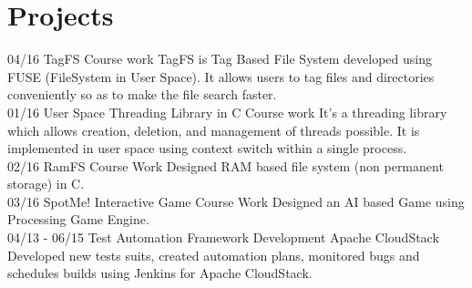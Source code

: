 \documentclass[]{friggeri-cv}
\begin{document}
\section{Projects}
\begin{entrylist}
  \entry
    {04/16}
    {TagFS}
    {Course work}
    {TagFS is Tag Based File System developed using FUSE (FileSystem in User Space). It allows users to tag files and directories conveniently so as to make the file search faster.\\}
    \entry
    {01/16}
    {User Space Threading Library in C}
    {Course work}
    {It's a threading library which allows creation, deletion, and management of threads possible. It is implemented in user space using context switch within a single process.\\}
    \entry
    {02/16}
    {RamFS}
    {Course Work}
    {Designed RAM based file system (non permanent storage) in C.\\}
    \entry
    {03/16}
    {SpotMe! Interactive Game}
    {Course Work}
    {Designed an AI based Game using Processing Game Engine.\\}
    \entry
    {04/13 - 06/15}
    {Test Automation Framework Development}
    {Apache CloudStack}
    {Developed new tests suits, created automation plans, monitored bugs and schedules builds using Jenkins for Apache CloudStack.}
\end{entrylist}
\end{document}
